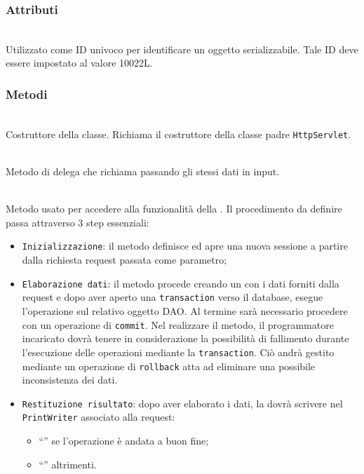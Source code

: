 \subsubsection*{Attributi}
\begin{description}
  \item{}\\
  Utilizzato come ID univoco per identificare un oggetto serializzabile. Tale ID deve essere impostato al valore 10022L.
\end{description}

\subsubsection*{Metodi}
\begin{description}
	\item{}\\
	Costruttore della classe. Richiama il costruttore della classe padre \texttt{HttpServlet}.
	
	\item{}\\
	Metodo di delega che richiama  passando gli stessi dati in input.
	
	\item{}\\
	Metodo usato per accedere alla funzionalità della . Il procedimento da definire passa attraverso 3 step essenziali:
	\begin{itemize}
		\item \texttt{Inizializzazione}: il metodo definisce ed apre una nuova sessione a partire dalla richiesta request passata come parametro;
		\item \texttt{Elaborazione dati}: il metodo procede creando un  con i dati forniti dalla request e dopo aver aperto una \texttt{transaction} verso il database, esegue l'operazione  sul relativo oggetto DAO. Al termine sarà necessario procedere con un operazione di \texttt{commit}. Nel realizzare il metodo, il programmatore incaricato dovrà tenere in considerazione la possibilità di fallimento durante l'esecuzione delle operazioni mediante la \texttt{transaction}. Ciò andrà gestito mediante un operazione di \texttt{rollback} atta ad eliminare una possibile inconsistenza dei dati.
		\item \texttt{Restituzione risultato}: dopo aver elaborato i dati, la  dovrà scrivere nel \texttt{PrintWriter} associato alla request:
			\begin{itemize}
				\item ``'' se l'operazione è andata a buon fine;
				\item ``'' altrimenti.
			\end{itemize}
	\end{itemize}

\end{description}

